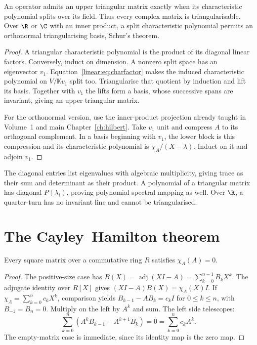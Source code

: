 \begin{theorem}[triangularisation]\label{linear:thm:schur}
An operator admits an upper triangular matrix exactly when its characteristic polynomial splits over its field. Thus every complex matrix is triangularisable. Over $\R$ or $\C$ with an inner product, a split characteristic polynomial permits an orthonormal triangularising basis, Schur's theorem.
\end{theorem}
\begin{proof}
A triangular characteristic polynomial is the product of its diagonal linear factors. Conversely, induct on dimension. A nonzero split space has an eigenvector $v_1$. Equation~\eqref{linear:eq:charfactor} makes the induced characteristic polynomial on $V/\mathbb Kv_1$ split too. Triangularise that quotient by induction and lift its basis. Together with $v_1$ the lifts form a basis, whose successive spans are invariant, giving an upper triangular matrix.

For the orthonormal version, use the inner-product projection already taught in Volume~1 and main Chapter~\ref{ch:hilbert}. Take $v_1$ unit and compress $A$ to its orthogonal complement. In a basis beginning with $v_1$, the lower block is this compression and its characteristic polynomial is $\chi_A/(X-\lambda)$. Induct on it and adjoin $v_1$.
\end{proof}

The diagonal entries list eigenvalues with algebraic multiplicity, giving trace as their sum and determinant as their product. A polynomial of a triangular matrix has diagonal $P(\lambda_i)$, proving polynomial spectral mapping as well. Over $\R$, a quarter-turn has no invariant line and cannot be triangularised.

\section{The Cayley--Hamilton theorem}
\begin{theorem}\label{linear:thm:cayleyhamilton}
Every square matrix over a commutative ring $R$ satisfies $\chi_A(A)=0$.
\end{theorem}
\begin{proof}
The positive-size case has $B(X)=\operatorname{adj}(XI-A)=\sum_{k=0}^{n-1}B_kX^k$. The adjugate identity over $R[X]$ gives $(XI-A)B(X)=\chi_A(X)I$. If $\chi_A=\sum_{k=0}^nc_kX^k$, comparison yields $B_{k-1}-AB_k=c_kI$ for $0\le k\le n$, with $B_{-1}=B_n=0$. Multiply on the left by $A^k$ and sum. The left side telescopes:
\[\sum_{k=0}^n(A^kB_{k-1}-A^{k+1}B_k)=0=\sum_{k=0}^nc_kA^k.
\]
The empty-matrix case is immediate, since its identity map is the zero map.
\end{proof}

